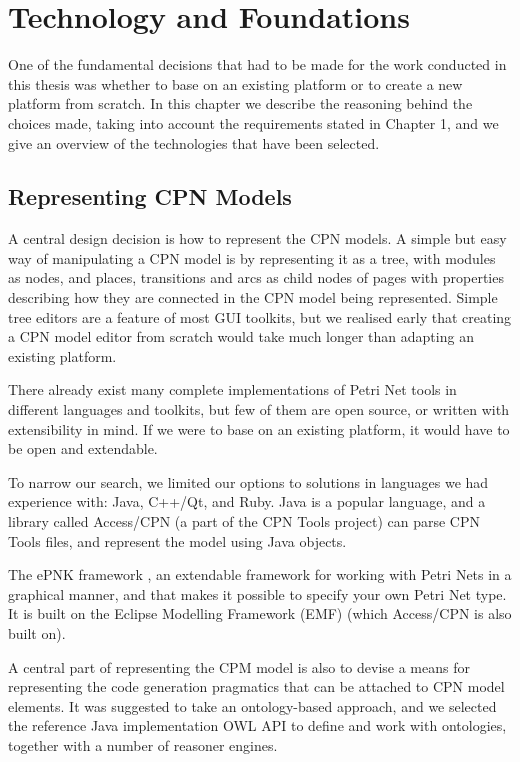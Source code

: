 \chapter{Technology and Foundations}
\label{chap:technology}

One of the fundamental decisions that had to be made for the work conducted
in this thesis was whether to base \thename{} on an existing platform or to
create a new platform from scratch. In this chapter we describe the
reasoning behind the choices made, taking into account the requirements stated
in Chapter 1, and we give an overview of the technologies that have been
selected.

\section{Representing CPN Models}
	
	A central design decision is how to represent the CPN models. A simple
	but easy way of manipulating a CPN model is by representing it as a tree, with
	modules as nodes, and places, transitions and arcs as child nodes of pages with
	properties describing how they are connected in the CPN model being
	represented. Simple tree editors are a feature of most GUI toolkits,
	but we realised early that creating a CPN model editor from scratch would take
	much longer than adapting an existing platform.

	There already exist many complete implementations of Petri Net tools in
	different languages and toolkits, but few of them are open source, or written
	with extensibility in mind. If we were to base \thename{} on an existing
	platform, it would have to be open and extendable. 
	
	To narrow our search, we limited our options to solutions in
	languages we had experience with: Java, C++/Qt, and Ruby. Java is a popular
	language, and a library called Access/CPN \cite{accesscpn} (a part of the CPN
	Tools project) can parse CPN Tools files, and represent the model using Java
	objects.
	
	The ePNK framework \cite{kindler2011epnk}, an extendable framework for working
	with Petri Nets in a graphical manner, and that makes it possible to specify
	your own Petri Net type. It is built on the Eclipse Modelling Framework (EMF)
	\cite{steinberg2008emf} (which Access/CPN is also built on). 

	A central part of representing the CPM model is also to devise a means for
	representing the code generation pragmatics that can be attached to CPN model
	elements. It was suggested to take an ontology-based approach, and we selected
	the reference Java implementation OWL API \cite{horridge2009owl} to define and work
	with ontologies, together with a number of reasoner engines.
	
